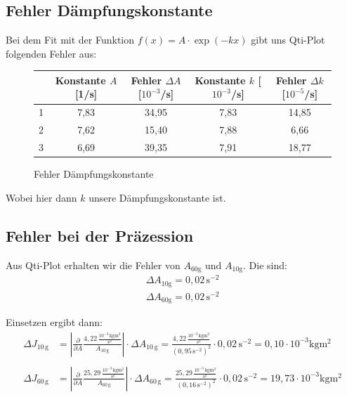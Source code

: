 \documentclass[fontsize=12pt]{scrartcl}
\renewcommand{\l}{\left\vert}
\renewcommand{\r}{\right\vert}
\begin{document}
\newpage

\subsection{Fehler Dämpfungskonstante}

Bei dem Fit mit der Funktion $f(x) = A \cdot \exp (-kx)$ gibt uns Qti-Plot folgenden Fehler aus:

\begin{figure}[H]
\centering
\caption{Fehler Dämpfungskonstante}
\begin{tabular}{|c|c|c|c|c|} \hline
& Konstante $A$ [1/s] & Fehler  $\Delta A$ [$10^{-3}$/s]  & Konstante $k$ [$10^{-3}$/s] & Fehler  $\Delta k$ [$10^{-5}$/s] \\ \hline
 1 &  7,83 & 34,95& 7,83 & 14,85\\ \hline
 2 & 7,62 & 15,40 & 7,88 & 6,66\\ \hline
 3 &   6,69 & 39,35 & 7,91 & 18,77\\ \hline
\end{tabular}				 
\end{figure}
Wobei hier dann $k$ unsere Dämpfungskonstante ist.

\subsection{Fehler bei der Präzession}

Aus Qti-Plot erhalten wir die Fehler von $A_{\text{60g}}$ und $A_{\text{10g}}$. Die sind:
\begin{align*}
\Delta A_{\text{10g}} = 0,02\,\text{s}^{-2} \\
\Delta A_{\text{60g}} =0,02\,\text{s}^{-2}
\end{align*} 

Einsetzen ergibt dann:
\begin{align*}
\Delta J_{10\,\text{g}}&= \l \frac{\partial}{\partial A}  \frac{4,22\,\frac{10^{-3}\,\text{kg}{\text{m}^2}}{{\text{s}^2}} }{A_{10\,\text{g}}} \r \cdot \Delta
A_{10\,\text{g}} =  \frac{4,22\,\frac{10^{-3}\,\text{kg}{\text{m}^2}}{{\text{s}^2}} }{(0,95\,\text{s}^{-2})^2} \cdot  0,02\,\text{s}^{-2} = 0,10\cdot 10^{-3}  \text{kg}{\text{m}^2} \\
~\\
\Delta J_{60\,\text{g}}&= \l \frac{\partial}{\partial A}  \frac{25,29\,\frac{10^{-3}\,\text{kg}{\text{m}^2}}{{\text{s}^2}} }{A_{60\,\text{g}}} \r \cdot \Delta
A_{60\,\text{g}} =  \frac{25,29\,\frac{10^{-3}\,\text{kg}{\text{m}^2}}{{\text{s}^2}} }{(0,16\,\text{s}^{-2})^2} \cdot  0,02\,\text{s}^{-2} = 19,73\cdot 10^{-3}  \text{kg}{\text{m}^2}
\end{align*}
\end{document}
